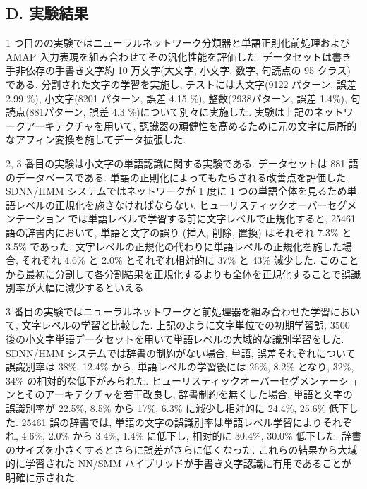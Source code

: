\documentclass[twocolumn]{jarticle}     %
\begin{document}
\subsection{D. 実験結果}
1 つ目のの実験ではニューラルネットワーク分類器と単語正則化前処理および AMAP 入力表現を組み合わせてその汎化性能を評価した. データセットは書き手非依存の手書き文字約 10 万文字(大文字, 小文字, 数字, 句読点の 95 クラス) である. 分割された文字の学習を実施し, テストには大文字(9122 パターン, 誤差 2.99 \%), 小文字(8201 パターン, 誤差 4.15 \%), 整数(2938パターン, 誤差 1.4\%), 句読点(881パターン, 誤差 4.3 \%)について別々に実施した. 実験は上記のネットワークアーキテクチャを用いて, 認識器の頑健性を高めるために元の文字に局所的なアフィン変換を施してデータ拡張した. 
\par
2, 3 番目の実験は小文字の単語認識に関する実験である. データセットは 881 語のデータベースである. 単語の正則化によってもたらされる改善点を評価した. SDNN/HMM システムではネットワークが 1 度に 1 つの単語全体を見るため単語レベルの正規化を施さなければならない. ヒューリスティックオーバーセグメンテーション では単語レベルで学習する前に文字レベルで正規化すると, 25461 語の辞書内において, 単語と文字の誤り (挿入, 削除, 置換) はそれぞれ 7.3\% と 3.5\% であった. 文字レベルの正規化の代わりに単語レベルの正規化を施した場合, それぞれ 4.6\% と 2.0\% とそれぞれ相対的に 37\% と 43\% 減少した. 
このことから最初に分割して各分割結果を正規化するよりも全体を正規化することで誤識別率が大幅に減少するといえる.
\par
3 番目の実験ではニューラルネットワークと前処理器を組み合わせた学習において, 文字レベルの学習と比較した. 上記のように文字単位での初期学習誤, 3500 後の小文字単語データセットを用いて単語レベルの大域的な識別学習をした. 
SDNN/HMM システムでは辞書の制約がない場合, 単語, 誤差それぞれについて誤識別率は 38\%, 12.4\% から, 単語レベルの学習後には 26\%, 8.2\% となり, 32\%, 34\% の相対的な低下がみられた. ヒューリスティックオーバーセグメンテーションとそのアーキテクチャを若干改良し, 辞書制約を無くした場合, 単語と文字の誤識別率が 22.5\%, 8.5\% から 17\%, 6.3\% に減少し相対的に 24.4\%, 25.6\% 低下した. 25461 誤の辞書では, 単語の文字の誤識別率は単語レベル学習によりそれぞれ, 4.6\%, 2.0\% から 3.4\%, 1.4\% に低下し, 相対的に 30.4\%, 30.0\% 低下した. 
辞書のサイズを小さくするとさらに誤差がさらに低くなった. これらの結果から大域的に学習された NN/SMM ハイブリッドが手書き文字認識に有用であることが明確に示された.
\end{document}

